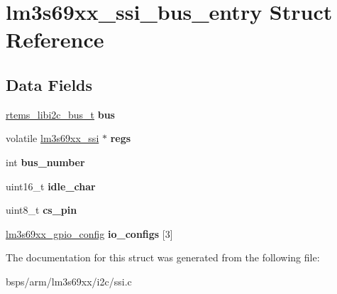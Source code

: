 \hypertarget{structlm3s69xx__ssi__bus__entry}{}\section{lm3s69xx\+\_\+ssi\+\_\+bus\+\_\+entry Struct Reference}
\label{structlm3s69xx__ssi__bus__entry}
\subsection*{Data Fields}
\begin{DoxyCompactItemize}
\item 
\mbox{\label{structlm3s69xx__ssi__bus__entry_a8262a323125918972d3512e411eae013}} 
\mbox{\hyperlink{structrtems__libi2c__bus__t__}{rtems\+\_\+libi2c\+\_\+bus\+\_\+t}} {\bfseries bus}
\item 
\mbox{\label{structlm3s69xx__ssi__bus__entry_afe6188a5abcd6421634dcb453d51f881}} 
volatile \mbox{\hyperlink{structlm3s69xx__ssi}{lm3s69xx\+\_\+ssi}} $\ast$ {\bfseries regs}
\item 
\mbox{\label{structlm3s69xx__ssi__bus__entry_a0c11db7b92d12c118dcac5c09788d42a}} 
int {\bfseries bus\+\_\+number}
\item 
\mbox{\label{structlm3s69xx__ssi__bus__entry_ae17a63bcbf25178e2b702717a6ce9193}} 
uint16\+\_\+t {\bfseries idle\+\_\+char}
\item 
\mbox{\label{structlm3s69xx__ssi__bus__entry_ae0a66db4b633f37dd1c3d55199c918f6}} 
uint8\+\_\+t {\bfseries cs\+\_\+pin}
\item 
\mbox{\label{structlm3s69xx__ssi__bus__entry_ab92ba6a1febf4385c21fa16624be3b6a}} 
\mbox{\hyperlink{structlm3s69xx__gpio__config}{lm3s69xx\+\_\+gpio\+\_\+config}} {\bfseries io\+\_\+configs} \mbox{[}3\mbox{]}
\end{DoxyCompactItemize}


The documentation for this struct was generated from the following file\+:\begin{DoxyCompactItemize}
\item 
bsps/arm/lm3s69xx/i2c/ssi.\+c\end{DoxyCompactItemize}

